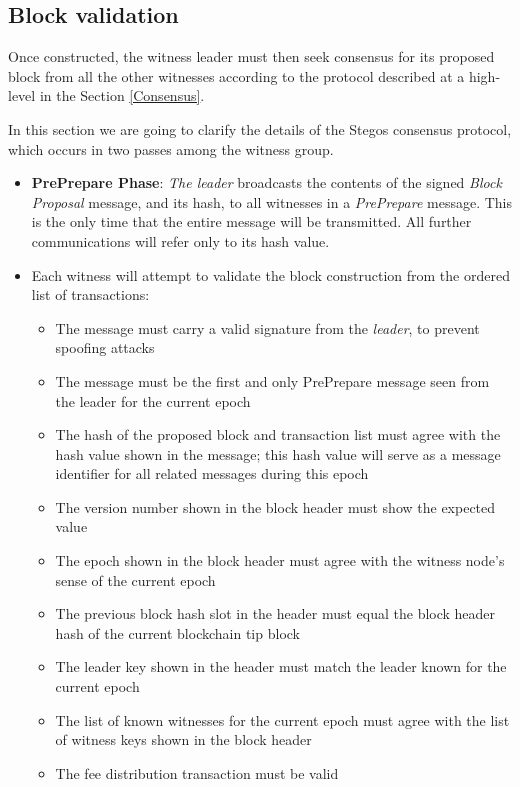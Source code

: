 \documentclass[8pt,fleqn,openany]{book}
\begin{document}
\subsection{Block validation} Once constructed, the witness leader must then seek consensus for its proposed block from all the other witnesses according to the protocol described at a high-level in the Section \ref{Consensus}. 

In this section we are going to clarify the details of the Stegos consensus protocol, which occurs in two passes among the witness group.

\begin{itemize}
  \item {\textbf{PrePrepare Phase}: \textit{The leader} broadcasts the contents of the signed \textit{Block Proposal} message, and its hash, to all witnesses in a \textit{PrePrepare} message. This is the only time that the entire message will be transmitted. All further communications will refer only to its hash value.}
  \item {Each witness will attempt to validate the block construction from the ordered list of transactions:
    \begin{itemize}
      \item {The message must carry a valid signature from the \textit{leader}, to prevent spoofing attacks}
      \item {The message must be the first and only PrePrepare message seen from the leader for the current epoch}
      \item {The hash of the proposed block and transaction list must agree with the hash value shown in the message; this hash value will serve as a message identifier for all related messages during this epoch}
      \item {The version number shown in the block header must show the expected value}
      \item {The epoch shown in the block header must agree with the witness node's sense of the current epoch}
      \item {The previous block hash slot in the header must equal the block header hash of the current blockchain tip block}
      \item {The leader key shown in the header must match the leader known for the current epoch}
      \item {The list of known witnesses for the current epoch must agree with the list of witness keys shown in the block header}
      \item {The fee distribution transaction must be valid}

\end{itemize}}
\end{itemize}
\end{document}
